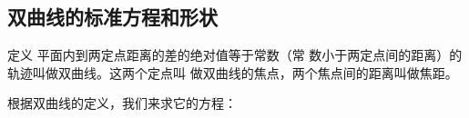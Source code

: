 \subsection{双曲线的标准方程和形状}
\begin{blk}
    {定义} 平面内到两定点距离的差的绝对值等于常数（常
数小于两定点间的距离）的轨迹叫做双曲线。这两个定点叫
做双曲线的焦点，两个焦点间的距离叫做焦距。
\end{blk}

根据双曲线的定义，我们来求它的方程：









\begin{example}
    
\end{example}

\begin{solution}
    
\end{solution}

\begin{example}
    
\end{example}



\begin{solution}
    
\end{solution}

\begin{example}
    
\end{example}



\begin{solution}
    
\end{solution}

\begin{example}
    
\end{example}



\begin{solution}
    
\end{solution}

\begin{example}
    
\end{example}



